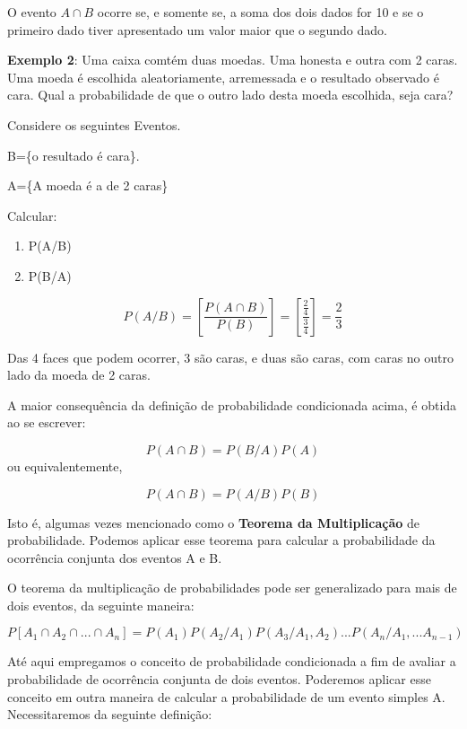 O evento $A \cap B$ ocorre se, e somente se, a soma dos dois dados
for 10 e se o primeiro dado tiver apresentado um valor maior que o
segundo dado.\vskip0.3cm


\textbf{Exemplo 2}: Uma caixa comtém duas moedas. Uma honesta e
outra com 2 caras. Uma moeda é escolhida aleatoriamente,
arremessada e o resultado observado é cara. Qual a probabilidade
de que o outro lado desta moeda escolhida, seja cara?\vskip0.3cm

Considere os seguintes Eventos.\vskip0.3cm

B=\{o resultado é cara\}.

A=\{A moeda é a de 2 caras\}

\vskip0.3cm

Calcular:

\begin{enumerate}
    \item P(A/B)
    \item P(B/A)
\end{enumerate}


$$P(A/B) = \left[ \frac{P(A \cap B)}{P(B)} \right] = \left[ \frac{\frac{2}{4}}{\frac{3}{4}} \right] = \frac{2}{3}$$

Das 4 faces que podem ocorrer, 3 são caras, e duas são caras, com
caras no outro lado da moeda de 2 caras.\vskip0.3cm

A maior consequência da definição de probabilidade condicionada
acima, é obtida ao se escrever:


$$
P(A \cap B)= P(B/A)P(A)
$$
 ou equivalentemente,

$$
P(A \cap B)= P(A/B)P(B)
$$


Isto é, algumas vezes mencionado como o \textbf{Teorema da
Multiplicação} de probabilidade. Podemos aplicar esse teorema para
calcular a probabilidade da ocorrência conjunta dos eventos A e B.
\vskip0.3cm

O teorema da multiplicação de probabilidades pode ser generalizado
para mais de dois eventos, da seguinte maneira:

\begin{equation}\label{}
    P[A_{1} \cap A_{2} \cap ... \cap A_{n}]=
    P(A_{1})P(A_{2}/A_{1})P(A_{3}/A_{1},A_{2})...P(A_{n}/A_{1},...A_{n-1})
\end{equation}

Até aqui empregamos o conceito de probabilidade condicionada a fim
de avaliar a probabilidade de ocorrência conjunta de dois eventos.
Poderemos aplicar esse conceito em outra maneira de calcular a
probabilidade de um evento simples A. Necessitaremos da seguinte
definição:\vskip0.3cm

